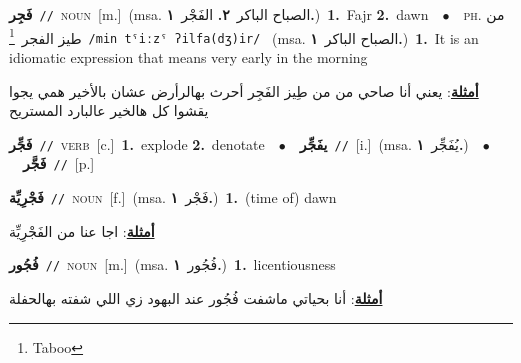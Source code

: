 \documentclass[10pt,a4paper,twoside]{article} %
\begin{document}
\begin{multicols}{2}
{{{{{{{{{{{\setlength\topsep{0pt}\textbf{\foreignlanguage{arabic}{فَجِر}}\ {\color{gray}\texttt{//}\color{black}}\ \textsc{noun}\ [m.]\ \color{gray}(msa. \foreignlanguage{arabic}{الصباح الباكر}~\foreignlanguage{arabic}{\textbf{٢.}}  \foreignlanguage{arabic}{الفَجْر}~\foreignlanguage{arabic}{\textbf{١.}})\color{black}\ \textbf{1.}~Fajr  \textbf{2.}~dawn\ \ $\bullet$\ \ \textsc{ph.} \color{gray} \foreignlanguage{arabic}{من طيز الفجر}\color{black}\ \footnote{Taboo}\ {\color{gray}\texttt{/{\sffamily min tˤiːzˤ ʔilfa(dʒ)ir}/}\color{black}}\ \color{gray} (msa. \foreignlanguage{arabic}{الصباح الباكر}~\foreignlanguage{arabic}{\textbf{١.}})\color{black}\ \textbf{1.}~It is an idiomatic expression that means very early in the morning\  \begin{flushright}\color{gray}\foreignlanguage{arabic}{\textbf{\underline{\foreignlanguage{arabic}{أمثلة}}}: يعني أنا صاحي من من طِيز الفَجِر أحرث بهالرأرض عشان بالأخير همي يجوا يقشوا كل هالخير عالبارد المستريح}\end{flushright}\color{black}} \vspace{2mm}

{\setlength\topsep{0pt}\textbf{\foreignlanguage{arabic}{فَجِّر}}\ {\color{gray}\texttt{//}\color{black}}\ \textsc{verb}\ [c.]\ \textbf{1.}~explode  \textbf{2.}~denotate\ \ $\bullet$\ \ \setlength\topsep{0pt}\textbf{\foreignlanguage{arabic}{يفَجِّر}}\ {\color{gray}\texttt{//}\color{black}}\ [i.]\ \color{gray}(msa. \foreignlanguage{arabic}{يُفَجِّر}~\foreignlanguage{arabic}{\textbf{١.}})\color{black}\ \ $\bullet$\ \ \setlength\topsep{0pt}\textbf{\foreignlanguage{arabic}{فَجَّر}}\ {\color{gray}\texttt{//}\color{black}}\ [p.]\ 

{\setlength\topsep{0pt}\textbf{\foreignlanguage{arabic}{فَجْرِيِّة}}\ {\color{gray}\texttt{//}\color{black}}\ \textsc{noun}\ [f.]\ \color{gray}(msa. \foreignlanguage{arabic}{فَجْر}~\foreignlanguage{arabic}{\textbf{١.}})\color{black}\ \textbf{1.}~(time of) dawn\  \begin{flushright}\color{gray}\foreignlanguage{arabic}{\textbf{\underline{\foreignlanguage{arabic}{أمثلة}}}: اجا عنا من الفَجْرِيِّة}\end{flushright}\color{black}} \vspace{2mm}

{\setlength\topsep{0pt}\textbf{\foreignlanguage{arabic}{فُجُور}}\ {\color{gray}\texttt{//}\color{black}}\ \textsc{noun}\ [m.]\ \color{gray}(msa. \foreignlanguage{arabic}{فُجُور}~\foreignlanguage{arabic}{\textbf{١.}})\color{black}\ \textbf{1.}~licentiousness\  \begin{flushright}\color{gray}\foreignlanguage{arabic}{\textbf{\underline{\foreignlanguage{arabic}{أمثلة}}}: أنا بحياتي ماشفت فُجُور عند البهود زي اللي شفته بهالحفلة}\end{flushright}\color{black}} \vspace{2mm}

}}}}}}}}}}}
\end{multicols}
\end{document}
